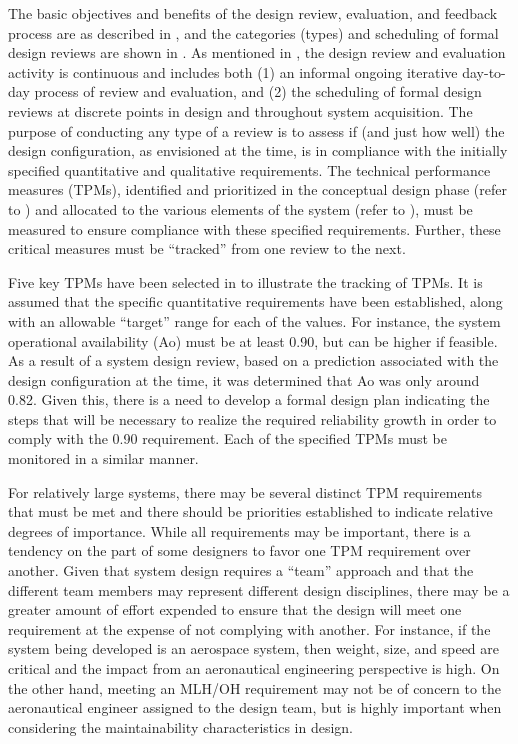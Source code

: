 The basic objectives and benefits of the design review, evaluation, and feedback process are as described in , and the categories (types) and scheduling of formal design reviews are shown in . As mentioned in , the design review and evaluation activity is continuous and includes both (1) an informal ongoing iterative day-to-day process of review and evaluation, and (2) the scheduling of formal design reviews at discrete points in design and throughout system acquisition. The purpose of conducting any type of a review is to assess if (and just how well) the design configuration, as envisioned at the time, is in compliance with the initially specified quantitative and qualitative requirements. The technical performance measures (TPMs), identified and prioritized in the conceptual design phase (refer to ) and allocated to the various elements of the system (refer to ), must be measured to ensure compliance with these specified requirements. Further, these critical measures must be ``tracked'' from one review to the next.

Five key TPMs have been selected in to illustrate the tracking of TPMs. It is assumed that the specific quantitative requirements have been established, along with an allowable “target” range for each of the values. For instance, the system operational availability (Ao) must be at least 0.90, but can be higher if feasible. As a result of a system design review, based on a prediction associated with the design configuration at the time, it was determined that Ao was only around 0.82. Given this, there is a need to develop a formal design plan indicating the steps that will be necessary to realize the required reliability growth in order to comply with the 0.90 requirement. Each of the specified TPMs must be monitored in a similar manner.

For relatively large systems, there may be several distinct TPM requirements that must be met and there should be priorities established to indicate relative degrees of importance. While all requirements may be important, there is a tendency on the part of some designers to favor one TPM requirement over another. Given that system design requires a ``team'' approach and that the different team members may represent different design disciplines, there may be a greater amount of effort expended to ensure that the design will meet one requirement at the expense of not complying with another. For instance, if the system being developed is an aerospace system, then weight, size, and speed are critical and the impact from an aeronautical engineering perspective is high. On the other hand, meeting an MLH/OH requirement may not be of concern to the aeronautical engineer assigned to the design team, but is highly important when considering the maintainability characteristics in design.

